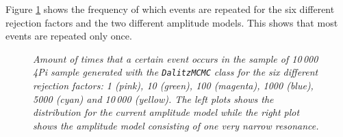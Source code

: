 Figure \ref{fig:hauf} shows the frequency of which events are repeated for the six different rejection factors and the two different amplitude models. This shows that most events are repeated only once.\\
\begin{figure}[!h]
\vspace*{-0.cm}
  \begin{center}
  \vspace*{-1.0cm}
  \end{center}
  \caption{\textit{Amount of times that a certain event occurs in the sample of 10\,000 \DzTo4Pi sample generated with the \texttt{DalitzMCMC} class for the six different rejection factors: 1 (pink), 10 (green), 100 (magenta), 1000 (blue), 5000 (cyan) and 10\,000 (yellow). The left plots shows the distribution for the current \Dz amplitude model while the right plot shows the amplitude model consisting of one very narrow resonance.}}
  \label{fig:hauf}
\end{figure}


